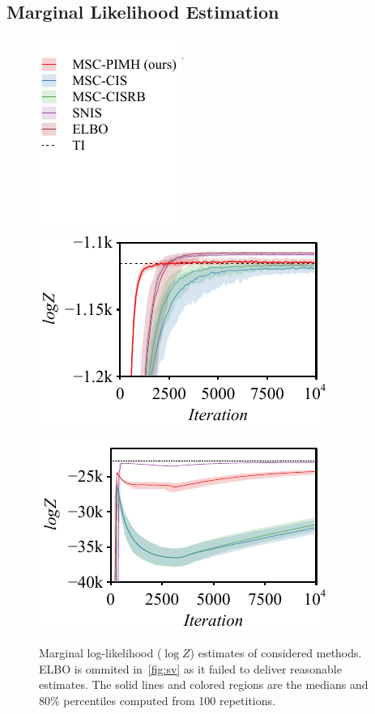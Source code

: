\subsection{Marginal Likelihood Estimation}
%
\begin{figure}[H]
  \vspace{-0.1in}
  \centering
  \begin{minipage}[b]{0.17\linewidth}
    \centering
    \includegraphics[scale=0.75]{figures/radon_03.pdf}
  \end{minipage}
  \begin{minipage}[b]{0.35\linewidth}
    \centering
    \includegraphics[scale=0.7]{figures/radon_02.pdf}
  \end{minipage}
  \begin{minipage}[b]{0.35\linewidth}
    \centering
    \includegraphics[scale=0.7]{figures/sv_02.pdf}\label{fig:sv}
  \end{minipage}
  \caption{Marginal log-likelihood (\(\log Z\)) estimates of considered methods.
    ELBO is ommited in~\cref{fig:sv} as it failed to deliver reasonable estimates.
    The solid lines and colored regions are the medians and 80\% percentiles computed from 100 repetitions.
  }\label{fig:marginal_likelihood}
  \vspace{-0.15in}
\end{figure}
%
